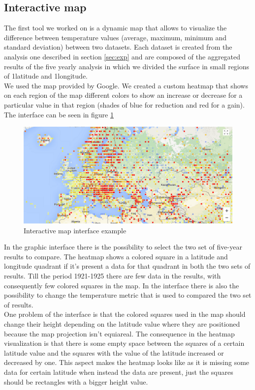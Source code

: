 \documentclass{vldb}
\begin{document}
\subsection{Interactive map}
\label{sec:map}
The first tool we worked on is a dynamic map that allows to visualize the difference between temperature values (average, maximum, minimum and standard deviation) between two datasets. Each dataset is created from the analysis one described in section \ref{sec:exp} and are composed of the aggregated results of the five yearly analysis in which we divided the surface in small regions of 1\degree latitude and 1\degree longitude. \\
We used the map provided by Google\cite{maps}. We created a custom heatmap that shows on each region of the map different colors to show an increase or decrease for a particular value in that region (shades of blue for reduction and red for a gain). The interface can be seen in figure \ref{fig:interface}

\begin{figure}[tbh]
\includegraphics[width=1\linewidth]{interface}
\caption{Interactive map interface example}
\label{fig:interface}
\end{figure}

In the graphic interface there is the possibility to select the two set of five-year results to compare. The heatmap shows a colored square in a latitude and longitude quadrant if it's present a data for that quadrant in both the two sets of results. Till the period 1921-1925 there are few data in the results, with consequently few colored squares in the map. In the interface there is also the possibility to change the temperature metric that is used to compared the two set of results.\\
One problem of the interface is that the colored squares used in the map should change their height depending on the latitude value where they are positioned because the map projection isn't equiareal. The consequence in the heatmap visualization is that there is some empty space between the squares of a certain latitude value and the squares with the value of the latitude increased or decreased by one. This aspect makes the heatmap looks like as it is missing some data for certain latitude when instead the data are present, just the squares should be rectangles with a bigger height value.\\
\end{document}
